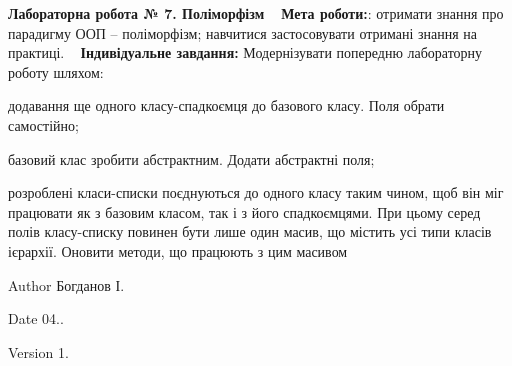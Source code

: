 {\bfseries{ Лабораторна робота № 7. Поліморфізм }} ~\newline
{\bfseries{Мета роботи\+:}}\+: отримати знання про парадигму ООП – поліморфізм; навчитися застосовувати отримані знання на практиці. ~\newline
 {\bfseries{Індивідуальне завдання\+:}} Модернізувати попередню лабораторну роботу шляхом\+:
\begin{DoxyItemize}
\item додавання ще одного класу-\/спадкоємця до базового класу. Поля обрати самостійно;
\item базовий клас зробити абстрактним. Додати абстрактні поля;
\item розроблені класи-\/списки поєднуються до одного класу таким чином, щоб він міг працювати як з базовим класом, так і з його спадкоємцями. При цьому серед полів класу-\/списку повинен бути лише один масив, що містить усі типи класів ієрархії. Оновити методи, що працюють з цим масивом ~\newline
 \begin{DoxyAuthor}{Author}
Богданов І. 
\end{DoxyAuthor}
\begin{DoxyDate}{Date}
04.. 
\end{DoxyDate}
\begin{DoxyVersion}{Version}
1. 
\end{DoxyVersion}

\end{DoxyItemize}